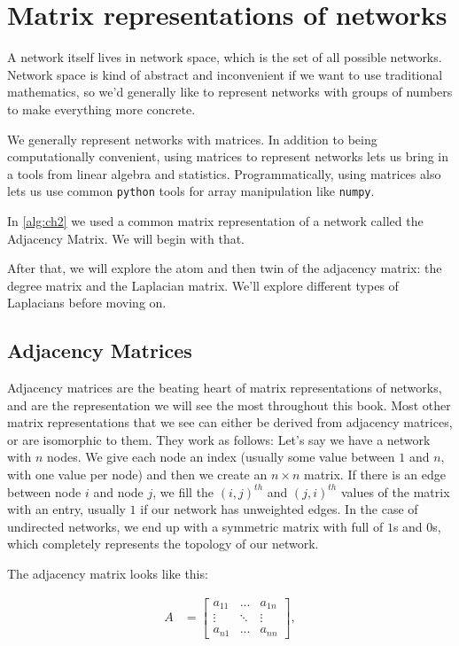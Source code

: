 \section{Matrix representations of networks}
\label{sec:ch4:mtx-rep}

A network itself lives in network space, which is the set of all possible networks. Network space is kind of abstract and inconvenient if we want to use traditional mathematics, so we'd generally like to represent networks with groups of numbers to make everything more concrete.

We generally represent networks with matrices. In addition to being computationally convenient, using matrices to represent networks lets us bring in a tools from linear algebra and statistics. Programmatically, using matrices also lets us use common \texttt{python} tools for array manipulation like \texttt{numpy}.

In \ref{alg:ch2} we used a common matrix representation of a network called the Adjacency Matrix. We will begin with that.

After that, we will explore the atom and then twin of the adjacency matrix: the degree matrix and the Laplacian matrix. We'll explore different types of Laplacians before moving on.

\subsection{Adjacency Matrices}

Adjacency matrices \cite{Godsil} are the beating heart of matrix representations of networks, and are the representation we will see the most throughout this book. Most other matrix representations that we see can either be derived from adjacency matrices, or are isomorphic to them. They work as follows: Let's say we have a network with $n$ nodes. We give each node an index (usually some value between $1$ and $n$, with one value per node) and then we create an $n \times n$ matrix. If there is an edge between node $i$ and node $j$, we fill the $(i, j)^{th}$ and $(j, i)^{th}$ values of the matrix with an entry, usually $1$ if our network has unweighted edges. In the case of undirected networks, we end up with a symmetric matrix with full of $1$s and $0$s, which completely represents the topology of our network.

The adjacency matrix looks like this:

\begin{align*}
    A &= \begin{bmatrix}
        a_{11} & ... & a_{1n} \\
        \vdots & \ddots & \vdots \\
        a_{n1} & ... & a_{nn}
    \end{bmatrix},
\end{align*}

